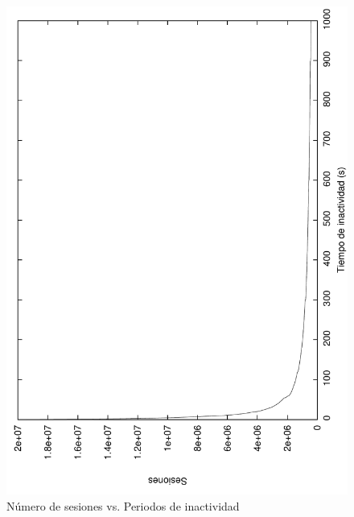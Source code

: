 \documentclass[twocolumn]{Jornadas}
\begin{document}
\begin{figure}[]
\begin{center}
  \includegraphics[scale=0.30,angle=-90]{figures/inactivityPeriod_full.pdf}
\end{center}
\caption{Número de sesiones vs. Periodos de inactividad} \label{fig:numberSessions}
\end{figure}
\end{document}
